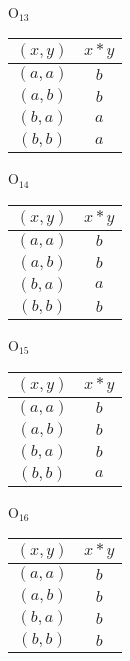 \documentclass[10pt]{article}
\begin{document}
\\\\\\O$_{13}$\begin{tabular}{c|c}
$(x,y)$ & $x * y$ \\
\hline
$(a,a)$ & $b$ \\
$(a,b)$ & $b$ \\
$(b,a)$ & $a$ \\
$(b,b)$ & $a$
\end{tabular}
\quad
O$_{14}$\begin{tabular}{c|c}
$(x,y)$ & $x * y$ \\
\hline
$(a,a)$ & $b$ \\
$(a,b)$ & $b$ \\
$(b,a)$ & $a$ \\
$(b,b)$ & $b$
\end{tabular}
\quad
O$_{15}$\begin{tabular}{c|c}
$(x,y)$ & $x * y$ \\
\hline
$(a,a)$ & $b$ \\
$(a,b)$ & $b$ \\
$(b,a)$ & $b$ \\
$(b,b)$ & $a$
\end{tabular}
\quad
O$_{16}$\begin{tabular}{c|c}
$(x,y)$ & $x * y$ \\
\hline
$(a,a)$ & $b$ \\
$(a,b)$ & $b$ \\
$(b,a)$ & $b$ \\
$(b,b)$ & $b$
\end{tabular}
\end{document}
